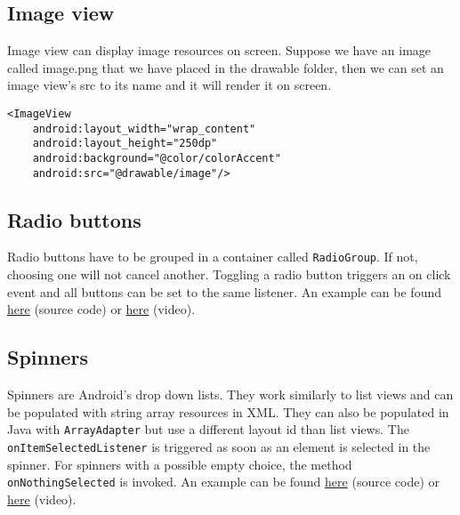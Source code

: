 \subsection{Image view}
Image view can display image resources on screen. Suppose we have an image called image.png that we have placed in the drawable folder, then we can set an image view's src to its name and it will render it on screen.
\begin{lstlisting}[style=A_XML]
<ImageView
    android:layout_width="wrap_content"
    android:layout_height="250dp"
    android:background="@color/colorAccent"
    android:src="@drawable/image"/>
\end{lstlisting}

\subsection{Radio buttons}
Radio buttons have to be grouped in a container called \texttt{RadioGroup}. If not, choosing one will not cancel another. Toggling a radio button triggers an on click event and all buttons can be set to the same listener. An example can be found \href{https://github.com/JonSteinn/AndroidDevelopment/tree/master/examples/lab1/radiobuttons}{here} (source code) or \href{TODO}{here} (video).

\subsection{Spinners}
Spinners are Android's drop down lists. They work similarly to list views and can be populated with string array resources in XML. They can also be populated in Java with \texttt{ArrayAdapter} but use a different layout id than list views. The \texttt{onItemSelectedListener} is triggered as soon as an element is selected in the spinner. For spinners with a possible empty choice, the method \texttt{onNothingSelected} is invoked. An example can be found \href{https://github.com/JonSteinn/AndroidDevelopment/tree/master/examples/lab1/spinner}{here} (source code) or \href{TODO}{here} (video).


